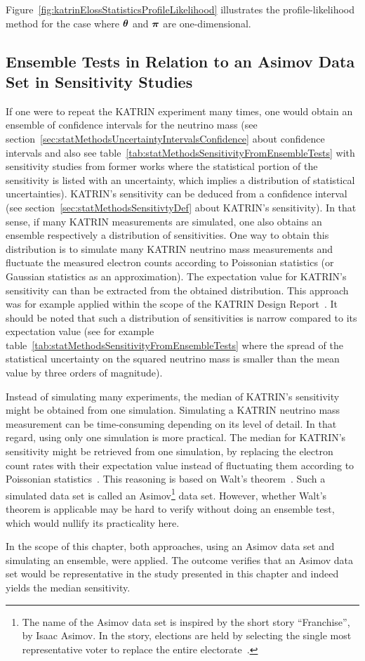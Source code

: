 Figure~\ref{fig:katrinElossStatisticsProfileLikelihood} illustrates the profile-likelihood method for the case where $\boldsymbol{\mathbf{\theta}}$ and $\boldsymbol{\mathbf{\pi}}$ are one-dimensional.

\subsection{Ensemble Tests in Relation to an Asimov Data Set in Sensitivity Studies}
\label{sec:katrinElossStatisticsAsimov}
If one were to repeat the KATRIN experiment many times, one would obtain an ensemble of confidence intervals for the neutrino mass (see section~\ref{sec:statMethodsUncertaintyIntervalsConfidence} about confidence intervals and also see table~\ref{tab:statMethodsSensitivityFromEnsembleTests} with sensitivity studies from former works where the statistical portion of the sensitivity is listed with an uncertainty, which implies a distribution of statistical uncertainties). KATRIN's sensitivity can be deduced from a confidence interval (see section~\ref{sec:statMethodsSensitivtyDef} about KATRIN's sensitivity). In that sense, if many KATRIN measurements are simulated, one also obtains an ensemble respectively a distribution of sensitivities. One way to obtain this distribution is to simulate many KATRIN neutrino mass measurements and fluctuate the measured electron counts according to Poissonian statistics (or Gaussian statistics as an approximation). The expectation value for KATRIN's sensitivity can than be extracted from the obtained distribution. This approach was for example applied within the scope of the KATRIN Design Report~\cite{Angrik:2005ep}. It should be noted that such a distribution of sensitivities is narrow compared to its expectation value (see for example table~\ref{tab:statMethodsSensitivityFromEnsembleTests} where the spread of the statistical uncertainty on the squared neutrino mass is smaller than the mean value by three orders of magnitude).

Instead of simulating many experiments, the median of KATRIN's sensitivity might be obtained from one simulation. Simulating a KATRIN neutrino mass measurement can be time-consuming depending on its level of detail. In that regard, using only one simulation is more practical. The median for KATRIN's sensitivity might be retrieved from one simulation, by replacing the electron count rates with their expectation value instead of fluctuating them according to Poissonian statistics~\cite{Cowan2011}. This reasoning is based on Walt's theorem~\cite{Wald1944}. Such a simulated data set is called an Asimov\footnote{The name of the Asimov data set is inspired by the short story ``Franchise'', by Isaac Asimov. In the story, elections are held by selecting the single most representative voter to replace the entire electorate~\cite{Cowan2011}.} data set. However, whether Walt's theorem is applicable may be hard to verify without doing an ensemble test, which would nullify its practicality here.

In the scope of this chapter, both approaches, using an Asimov data set and simulating an ensemble, were applied. The outcome verifies that an Asimov data set would be representative in the study presented in this chapter and indeed yields the median sensitivity.